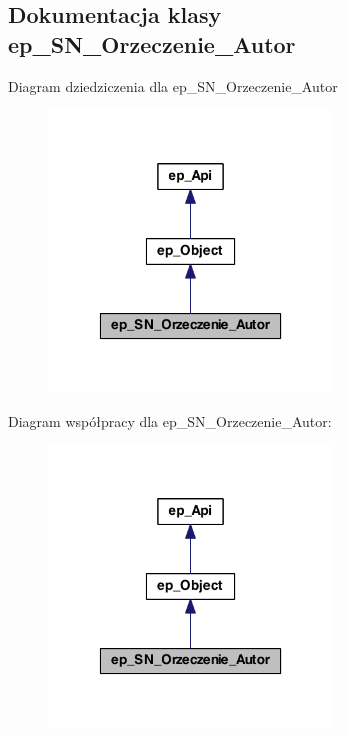 \hypertarget{classep___s_n___orzeczenie___autor}{\subsection{Dokumentacja klasy ep\-\_\-\-S\-N\-\_\-\-Orzeczenie\-\_\-\-Autor}
\label{classep___s_n___orzeczenie___autor}
}


Diagram dziedziczenia dla ep\-\_\-\-S\-N\-\_\-\-Orzeczenie\-\_\-\-Autor\nopagebreak
\begin{figure}[H]
\begin{center}
\leavevmode
\includegraphics[width=214pt]{classep___s_n___orzeczenie___autor__inherit__graph}
\end{center}
\end{figure}


Diagram współpracy dla ep\-\_\-\-S\-N\-\_\-\-Orzeczenie\-\_\-\-Autor\-:\nopagebreak
\begin{figure}[H]
\begin{center}
\leavevmode
\includegraphics[width=214pt]{classep___s_n___orzeczenie___autor__coll__graph}
\end{center}
\end{figure}
